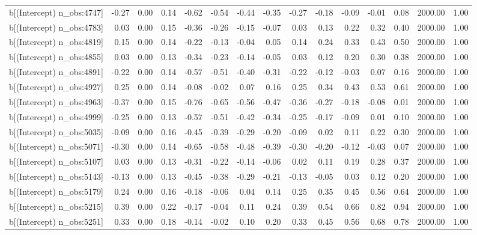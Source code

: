 \begin{table}[ht]
\begin{tabular}{rrrrrrrrrrrrrrr}
  b[(Intercept) n\_obs:4747] & -0.27 & 0.00 & 0.14 & -0.62 & -0.54 & -0.44 & -0.35 & -0.27 & -0.18 & -0.09 & -0.01 & 0.08 & 2000.00 & 1.00 \\ 
  b[(Intercept) n\_obs:4783] & 0.03 & 0.00 & 0.15 & -0.36 & -0.26 & -0.15 & -0.07 & 0.03 & 0.13 & 0.22 & 0.32 & 0.40 & 2000.00 & 1.00 \\ 
  b[(Intercept) n\_obs:4819] & 0.15 & 0.00 & 0.14 & -0.22 & -0.13 & -0.04 & 0.05 & 0.14 & 0.24 & 0.33 & 0.43 & 0.50 & 2000.00 & 1.00 \\ 
  b[(Intercept) n\_obs:4855] & 0.03 & 0.00 & 0.13 & -0.34 & -0.23 & -0.14 & -0.05 & 0.03 & 0.12 & 0.20 & 0.30 & 0.38 & 2000.00 & 1.00 \\ 
  b[(Intercept) n\_obs:4891] & -0.22 & 0.00 & 0.14 & -0.57 & -0.51 & -0.40 & -0.31 & -0.22 & -0.12 & -0.03 & 0.07 & 0.16 & 2000.00 & 1.00 \\ 
  b[(Intercept) n\_obs:4927] & 0.25 & 0.00 & 0.14 & -0.08 & -0.02 & 0.07 & 0.16 & 0.25 & 0.34 & 0.43 & 0.53 & 0.61 & 2000.00 & 1.00 \\ 
  b[(Intercept) n\_obs:4963] & -0.37 & 0.00 & 0.15 & -0.76 & -0.65 & -0.56 & -0.47 & -0.36 & -0.27 & -0.18 & -0.08 & 0.01 & 2000.00 & 1.00 \\ 
  b[(Intercept) n\_obs:4999] & -0.25 & 0.00 & 0.13 & -0.57 & -0.51 & -0.42 & -0.34 & -0.25 & -0.17 & -0.09 & 0.01 & 0.10 & 2000.00 & 1.00 \\ 
  b[(Intercept) n\_obs:5035] & -0.09 & 0.00 & 0.16 & -0.45 & -0.39 & -0.29 & -0.20 & -0.09 & 0.02 & 0.11 & 0.22 & 0.30 & 2000.00 & 1.00 \\ 
  b[(Intercept) n\_obs:5071] & -0.30 & 0.00 & 0.14 & -0.65 & -0.58 & -0.48 & -0.39 & -0.30 & -0.20 & -0.12 & -0.03 & 0.07 & 2000.00 & 1.00 \\ 
  b[(Intercept) n\_obs:5107] & 0.03 & 0.00 & 0.13 & -0.31 & -0.22 & -0.14 & -0.06 & 0.02 & 0.11 & 0.19 & 0.28 & 0.37 & 2000.00 & 1.00 \\ 
  b[(Intercept) n\_obs:5143] & -0.13 & 0.00 & 0.13 & -0.45 & -0.38 & -0.29 & -0.21 & -0.13 & -0.05 & 0.03 & 0.12 & 0.20 & 2000.00 & 1.00 \\ 
  b[(Intercept) n\_obs:5179] & 0.24 & 0.00 & 0.16 & -0.18 & -0.06 & 0.04 & 0.14 & 0.25 & 0.35 & 0.45 & 0.56 & 0.64 & 2000.00 & 1.00 \\ 
  b[(Intercept) n\_obs:5215] & 0.39 & 0.00 & 0.22 & -0.17 & -0.04 & 0.11 & 0.24 & 0.39 & 0.54 & 0.66 & 0.82 & 0.94 & 2000.00 & 1.00 \\ 
  b[(Intercept) n\_obs:5251] & 0.33 & 0.00 & 0.18 & -0.14 & -0.02 & 0.10 & 0.20 & 0.33 & 0.45 & 0.56 & 0.68 & 0.78 & 2000.00 & 1.00 \\ 

\end{tabular}
\end{table}
